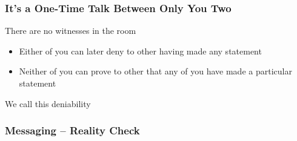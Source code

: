 \documentclass[
	aspectratio=169,
	xetex,
]{beamer}
\begin{document}
\begin{frame}
	\frametitle{It's a One-Time Talk Between Only You Two}
	There are no witnesses in the room
	\begin{itemize}
		\item Either of you can later deny to other having made any statement
		\item Neither of you can prove to other that any of you have made a particular statement
	\end{itemize}
	We call this \alert{deniability}
\end{frame}


\begin{frame}
	\frametitle{Messaging -- Reality Check}
\end{frame}
\end{document}
